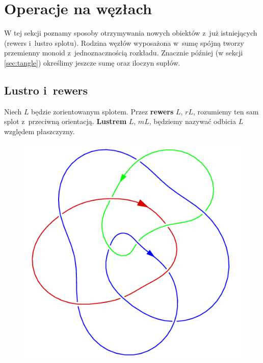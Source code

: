 \section{Operacje na węzłach} %
\label{sec:knot_operations}
W tej sekcji poznamy sposoby otrzymywania nowych obiektów z~już istniejących (rewers i~lustro splotu).
Rodzina węzłów wyposażona w~sumę spójną tworzy przemienny monoid z~jednoznacznością rozkładu.
Znacznie później (w sekcji \ref{sec:tangle}) określimy jeszcze sumę oraz iloczyn supłów.

\subsection{Lustro i~rewers} %
\label{sub:single_operations}
\begin{definition}
    Niech $L$ będzie zorientowanym splotem.
    Przez \textbf{rewers} $L$, $rL$,
    rozumiemy ten sam splot z~przeciwną orientacją.
    \textbf{Lustrem} $L$, $mL$,
    będziemy nazywać odbicia $L$ względem płaszczyzny.
    \begin{figure}[H]
        \begin{minipage}[b]{.32\linewidth}
            \centering
            \includegraphics[width=\linewidth]{../data/link_mirror.png}
        \end{minipage}

\end{figure}
\end{definition}
